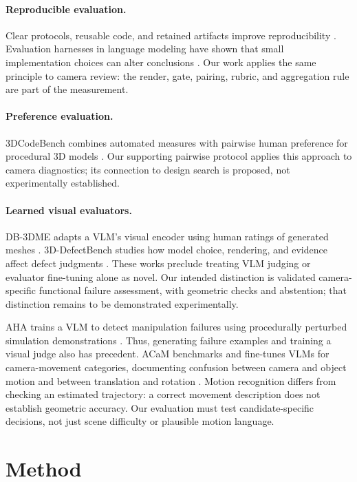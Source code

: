\documentclass[10pt,twocolumn]{article}
\begin{document}
\paragraph{Reproducible evaluation.} Clear protocols, reusable code, and retained artifacts improve reproducibility \cite{pineau2021improving}. Evaluation harnesses in language modeling have shown that small implementation choices can alter conclusions \cite{biderman2024lessons}. Our work applies the same principle to camera review: the render, gate, pairing, rubric, and aggregation rule are part of the measurement.

\paragraph{Preference evaluation.} 3DCodeBench combines automated measures with pairwise human preference for procedural 3D models \cite{gao2026codebench}. Our supporting pairwise protocol applies this approach to camera diagnostics; its connection to design search is proposed, not experimentally established.

\paragraph{Learned visual evaluators.} DB-3DME adapts a VLM's visual encoder using human ratings of generated meshes \cite{jia2026db3dme}. 3D-DefectBench studies how model choice, rendering, and evidence affect defect judgments \cite{zhao2026defectbench}. These works preclude treating VLM judging or evaluator fine-tuning alone as novel. Our intended distinction is validated camera-specific functional failure assessment, with geometric checks and abstention; that distinction remains to be demonstrated experimentally.

AHA trains a VLM to detect manipulation failures using procedurally perturbed simulation demonstrations \cite{duan2024aha}. Thus, generating failure examples and training a visual judge also has precedent. ACaM benchmarks and fine-tunes VLMs for camera-movement categories, documenting confusion between camera and object motion and between translation and rotation \cite{tan2026natural}. Motion recognition differs from checking an estimated trajectory: a correct movement description does not establish geometric accuracy. Our evaluation must test candidate-specific decisions, not just scene difficulty or plausible motion language.

\section{Method}
\end{document}
